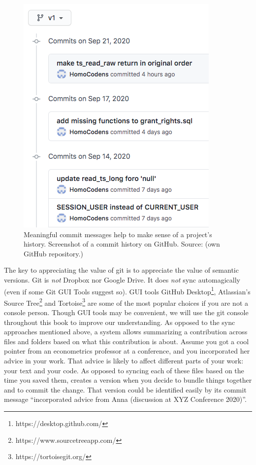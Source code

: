 \documentclass[
  12pt,
  letterpaper,
]{krantz}
\begin{document}
\begin{figure}

{\centering \includegraphics{./images/commits.png}

}

\caption{Meaningful commit messages help to make sense of a project's
history. Screenshot of a commit history on GitHub. Source: (own GitHub
repository.)}

\end{figure}

The key to appreciating the value of git is to appreciate the
value of semantic versions. Git is \emph{not} Dropbox nor Google Drive.
It does \emph{not} sync automagically (even if some Git GUI Tools
suggest so). GUI tools GitHub Desktop\footnote{https://desktop.github.com/},
Atlassian's Source Tree\footnote{https://www.sourcetreeapp.com/} and
Tortoise\footnote{https://tortoisegit.org/} are some of the most popular
choices if you are not a console person. Though GUI tools may be
convenient, we will use the git console throughout this book to improve
our understanding. As opposed to the sync approaches mentioned above, a
 system allows summarizing a contribution across
files and folders based on what this contribution is about. Assume you
got a cool pointer from an econometrics professor at a conference, and
you incorporated her advice in your work. That advice is likely to
affect different parts of your work: your text and your code. As opposed
to syncing each of these files based on the time you saved them,
 creates a version when you decide to bundle
things together and to commit the change. That version could be
identified easily by its commit message ``incorporated
advice from Anna (discussion at XYZ Conference 2020)''.
\end{document}
